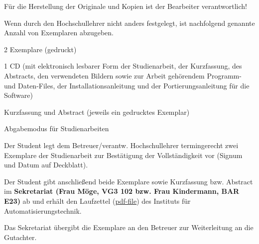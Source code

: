 Für die Herstellung der Originale und Kopien ist der Bearbeiter verantwortlich!

Wenn durch den Hochschullehrer nicht anders festgelegt, ist nachfolgend genannte Anzahl von Exemplaren abzugeben.

\begin{compactitem}
  \item 2 Exemplare (gedruckt)
  \item 1 CD (mit elektronisch lesbarer Form der Studienarbeit, der Kurzfassung, des Abstracts, den verwendeten Bildern sowie zur Arbeit gehörendem Programm- und Daten-Files, der Installationsanleitung und der Portierungsanleitung für die Software)
  \item Kurzfassung und Abstract (jeweils ein gedrucktes Exemplar)
  \item Abgabemodus für Studienarbeiten
    \begin{compactitem}
      \item Der Student legt dem Betreuer/verantw. Hochschullehrer termingerecht zwei Exemplare der Studienarbeit zur Bestätigung der Vollständigkeit vor (Signum und Datum auf Deckblatt).
      \item Der Student gibt anschließend beide Exemplare sowie Kurzfassung bzw. Abstract im {\bfseries Sekretariat (Frau Möge, VG3 102 bzw. Frau Kindermann, BAR E23)} ab und erhält den Laufzettel (\href{http://www.et.tu-dresden.de/ifa/fileadmin/user_upload/www_files/richtlinien_sa_da/DA-SA_Laufzettel.pdf}{pdf-file}) des Instituts für Automatisierungstechnik.
      \item Das Sekretariat übergibt die Exemplare an den Betreuer zur Weiterleitung an die Gutachter.
  \end{compactitem}
\end{compactitem}

